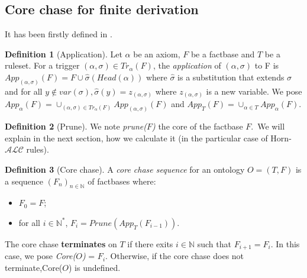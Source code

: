 \documentclass{article}
\theoremstyle{definition}
\newtheorem{definition}{Definition}[section]
\theoremstyle{remark}
\def \N {\mathbb N}
\begin{document}
\subsection{Core chase for finite derivation}

It has been firstly defined in \cite{chase}.

\begin{definition}[Application]
Let $\alpha$ be an axiom, $F$ be a factbase and $T$ be a ruleset. For a trigger $(\alpha,\sigma) \in Tr_\alpha(F)$, the \emph{application} of $(\alpha,\sigma)$ to F is $App_{(\alpha,\sigma)}(F) = F\cup \hat \sigma(Head(\alpha))$ where $\hat \sigma$ is a substitution that extends $\sigma$ and for all $y \notin var(\sigma), \hat \sigma(y) = z_{(\alpha,\sigma)}$ where $z_{(\alpha,\sigma)}$ is a new variable.
We pose $App_{\alpha}(F) = \cup_{(\alpha,\sigma) \in Tr_\alpha(F)}App_{(\alpha,\sigma)}(F)$ and $App_{T}(F) = \cup_{\alpha \in T}App_{\alpha}(F)$.

\end{definition} 

\begin{definition}[Prune]
We note \emph{prune($F$)} the core of the factbase $F$.\ We will explain in the next section, how we calculate it (in the particular case of Horn-$\mathcal{ALC}$ rules).

\end{definition} 

\begin{definition}[Core chase]
A \emph{core chase sequence} for an ontology $O = (T,F)$ is a sequence $(F_n)_{n \in \N}$ of factbases where: 
\begin{itemize}
\item $F_0 = F$;
\item for all $i \in \N^*$, $F_i = Prune(App_T(F_{i-1}))$.
\end{itemize}
The core chase \textbf{terminates} on $T$ if there exits $i \in \N$ such that $F_{i+1} = F_i$. In this case, we pose \emph{Core($O$)} = $F_i$. Otherwise, if the core chase does not terminate,Core($O$) is undefined.
\end{definition} 
\end{document}
